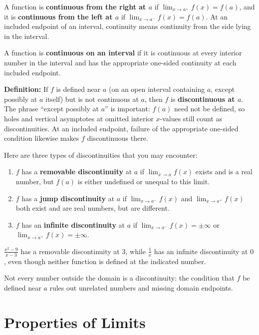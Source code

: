 A function is \textbf{continuous from the right at $a$} if $\displaystyle\lim_{x\to a^+}f(x)=f(a)$, and it is \textbf{continuous from the left at $a$} if $\displaystyle\lim_{x\to a^-}f(x)=f(a)$. At an included endpoint of an interval, continuity means continuity from the side lying in the interval.

A function is \textbf{continuous on an interval} if it is continuous at every interior number in the interval and has the appropriate one-sided continuity at each included endpoint.

\noindent\textbf{Definition:} If $f$ is defined near $a$ (on an open interval containing $a$, except possibly at $a$ itself) but is not continuous at $a$, then $f$ is \textbf{discontinuous at $a$}. The phrase ``except possibly at $a$'' is important: $f(a)$ need not be defined, so holes and vertical asymptotes at omitted interior $x$-values still count as discontinuities. At an included endpoint, failure of the appropriate one-sided condition likewise makes $f$ discontinuous there.

Here are three types of discontinuities that you may encounter:
\begin{enumerate}
\item $f$ has a \textbf{removable discontinuity} at $a$ if $\displaystyle\lim _{x \to a} f(x)$ exists and is a real number, but $f(a)$ is either undefined or unequal to this limit.
\item $f$ has a \textbf{jump discontinuity} at $a$ if $\displaystyle\lim _{x \to a^{-}} f(x)$ and $\displaystyle\lim _{x \to a^{+}} f(x)$ both exist and are real numbers, but are different.
\item $f$ has an \textbf{infinite discontinuity} at $a$ if $\displaystyle\lim _{x \to a^{-}} f(x)=\pm \infty$ or $\displaystyle\lim _{x \to a^{+}} f(x)=\pm \infty$.
\end{enumerate}

\begin{exampleblock}
$\frac{x^2-9}{x-3}$ has a removable discontinuity at $3$, while $\frac{1}{x}$ has an infinite discontinuity at $0$, even though neither function is defined at the indicated number.
\end{exampleblock}

Not every number outside the domain is a discontinuity: the condition that $f$ be defined near $a$ rules out unrelated numbers and missing domain endpoints.


\clearpage
\section{Properties of Limits}
\label{sec:limit-properties}


